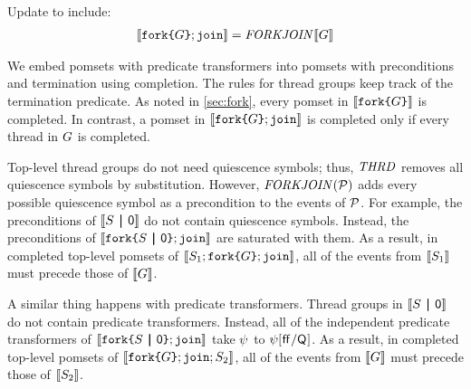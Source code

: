 \begin{definition}
  Update  to include:
  \begin{align*}
    \sem{\FORKJOIN{\aGrp}} = \sFORKJOIN{}\sem{\aGrp}  
  \end{align*}
\end{definition}

We embed pomsets with predicate transformers into pomsets with preconditions
and termination using {completion}.  The rules for thread groups keep track
of the termination predicate.
As noted in \textsection\ref{sec:fork}, every pomset in $\sem{\FORK{\aGrp}}$ is
completed.  In contrast, a pomset in $\sem{\FORKJOIN{\aGrp}}$ is completed
only if every thread in $G$ is completed.

Top-level thread groups do not need quiescence symbols; thus, $\sTHREAD{}$
removes all quiescence symbols by substitution.  However, $\sFORKJOIN{\aPSS}$
adds every possible quiescence symbol as a precondition to the events of
$\mathcal{P}$.  For example, the preconditions of $\sem{\THREAD{\aCmd}\PAR\NIL}$ do
not contain quiescence symbols.  Instead, the preconditions of
$\sem{\FORKJOIN{\THREAD{\aCmd}\PAR\NIL}}$ are saturated with them.  As a
result, in completed top-level pomsets of
$\sem{\aCmd_1\SEMI\FORKJOIN{\aGrp}}$, all of the events from
$\llbracket S_1\rrbracket$ must precede those of $\llbracket G\rrbracket$.

A similar thing happens with predicate transformers.  Thread groups in
$\sem{\THREAD{\aCmd}\PAR\NIL}$ do not contain predicate transformers.
Instead, all of the independent predicate transformers of
$\sem{\FORKJOIN{\THREAD{\aCmd}\PAR\NIL}}$ take $\psi$ to
$\psi[\mkern.6mu\mathsf{ff}\mkern.6mu/\mathsf{Q}_{}]$.  As a result, in completed top-level pomsets of
$\sem{\FORKJOIN{\aGrp}\SEMI\aCmd_2}$, all of the events from $\llbracket G\rrbracket$
must precede those of $\llbracket S_2\rrbracket$.



